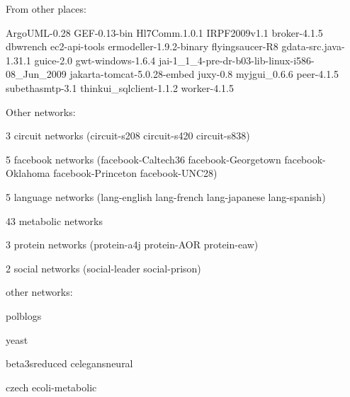 From other places:

ArgoUML-0.28
GEF-0.13-bin
Hl7Comm.1.0.1
IRPF2009v1.1
broker-4.1.5
dbwrench
ec2-api-tools
ermodeller-1.9.2-binary
flyingsaucer-R8
gdata-src.java-1.31.1
guice-2.0
gwt-windows-1.6.4
jai-1\_1\_4-pre-dr-b03-lib-linux-i586-08\_Jun\_2009
jakarta-tomcat-5.0.28-embed
juxy-0.8
myjgui\_0.6.6
peer-4.1.5
subethasmtp-3.1
thinkui\_sqlclient-1.1.2
worker-4.1.5

Other networks:

3 circuit networks (circuit-s208 circuit-s420 circuit-s838)

5 facebook networks (facebook-Caltech36 facebook-Georgetown facebook-Oklahoma
facebook-Princeton facebook-UNC28)

5 language networks (lang-english  lang-french lang-japanese lang-spanish)

43 metabolic networks

3 protein networks (protein-a4j protein-AOR protein-eaw)

2 social networks (social-leader social-prison)

other networks:

polblogs

yeast

beta3sreduced
celegansneural

czech
ecoli-metabolic
